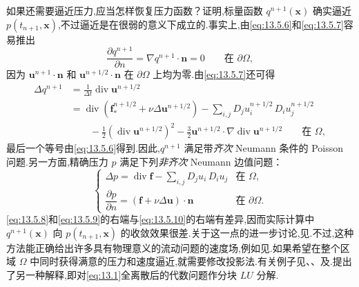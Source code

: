 如果还需要逼近压力,应当怎样恢复压力函数？证明,标量函数 \(q^{n+1}(\boldsymbol{x})\) 确实逼近 \(p(t_{n+1},\boldsymbol{x})\),不过逼近是在很弱的意义下成立的.事实上,由\eqref{eq:13.5.6}和\eqref{eq:13.5.7}容易推出
\begin{equation}\label{eq:13.5.8}
  \frac{\partial q^{n+1}}{\partial n}
     =\nabla q^{n+1}\cdot\boldsymbol{n}=0\qquad\text{在 }\partial\Omega,
\end{equation}
因为 \(\boldsymbol{u}^{n+1}\cdot\boldsymbol{n}\) 和 \(\boldsymbol{u}^{n+1/2}\cdot\boldsymbol{n}\) 在 \(\partial\Omega\) 上均为零.由\eqref{eq:13.5.7}还可得
\begin{equation}\label{eq:13.5.9}
  \begin{aligned}
    \Delta q^{n+1}
      &=\frac1{\Delta t}\operatorname{div}\boldsymbol{u}^{n+1/2}\\
      &=\operatorname{div}(\boldsymbol{f}_*^{n+1/2}+\nu\Delta\boldsymbol{u}^{n+1/2})
         -\sum_{i,j}D_j u_i^{n+1/2}\,D_i u_j^{n+1/2}\\
      &\qquad-\tfrac12(\operatorname{div}\boldsymbol{u}^{n+1/2})^2
         -\tfrac32\boldsymbol{u}^{n+1/2}\cdot\nabla\operatorname{div}\boldsymbol{u}^{n+1/2}
            \qquad\text{在 }\Omega,
  \end{aligned}
\end{equation}
最后一个等号由\eqref{eq:13.5.6}得到.因此,\(q^{n+1}\) 满足带\emph{齐次} Neumann 条件的 Poisson 问题.另一方面,精确压力 \(p\) 满足下列\emph{非齐次} Neumann 边值问题：
\begin{equation}\label{eq:13.5.10}
  \begin{cases}
    \Delta p=\operatorname{div}\boldsymbol{f}-\displaystyle\sum_{i,j}D_j u_i\,D_i u_j
      & \text{在 }\Omega,\\[2pt]
    \dfrac{\partial p}{\partial n}=(\boldsymbol{f}+\nu\Delta\boldsymbol{u})\cdot\boldsymbol{n}
      & \text{在 }\partial\Omega.
  \end{cases}
\end{equation}
\eqref{eq:13.5.8}和\eqref{eq:13.5.9}的右端与\eqref{eq:13.5.10}的右端有差异,因而实际计算中 \(q^{n+1}(\boldsymbol{x})\) 向 \(p(t_{n+1},\boldsymbol{x})\) 的收敛效果很差.关于这一点的进一步讨论,见.不过,这种方法能正确给出许多具有物理意义的流动问题的速度场,例如见.如果希望在整个区域 \(\Omega\) 中同时获得满意的压力和速度逼近,就需要修改投影法.有关例子见、、及.提出了另一种解释,即对\eqref{eq:13.1}全离散后的代数问题作分块 \(LU\) 分解.

